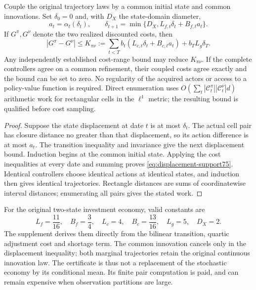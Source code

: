 \begin{theorem}\label{thm:displacement75}
Couple the original trajectory laws by a common initial state and common innovations. Set $\delta_0=0$ and, with $D_X$ the state-domain diameter,
\[
 a_t=\alpha_t(\delta_t),\qquad
 \delta_{t+1}=\min\{D_X,L_{f,t}\delta_t+B_{f,t}a_t\}.
\]
If $G^\pi,G^\nu$ denote the two realized discounted costs, then
\begin{equation}\label{eq:displacement-support75}
 |G^\pi-G^\nu|\le K_{\pi\nu}:=
 \sum_{t<T}b_t(L_{c,t}\delta_t+B_{c,t}a_t)+b_TL_g\delta_T.
\end{equation}
Any independently established cost-range bound may reduce $K_{\pi\nu}$. If the complete controllers agree on a common refinement, their coupled costs agree exactly and the bound can be set to zero. No regularity of the acquired actors or access to a policy-value function is required. Direct enumeration uses $O(\sum_t|\mathcal C_t^\pi||\mathcal C_t^\nu|d)$ arithmetic work for rectangular cells in the $\ell^1$ metric; the resulting bound is qualified before cost sampling.
\end{theorem}

\begin{proof}
Suppose the state displacement at date $t$ is at most $\delta_t$. The actual cell pair has closure distance no greater than that displacement, so its action difference is at most $a_t$. The transition inequality and invariance give the next displacement bound. Induction begins at the common initial state. Applying the cost inequalities at every date and summing proves \eqref{eq:displacement-support75}. Identical controllers choose identical actions at identical states, and induction then gives identical trajectories. Rectangle distances are sums of coordinatewise interval distances; enumerating all pairs gives the stated work.
\end{proof}

For the original two-state investment economy, valid constants are
\[
 L_f=\frac{11}{16},\quad B_f=\frac34,\quad
 L_c=4,\quad B_c=\frac{13}{16},\quad L_g=5,\quad D_X=2.
\]
The supplement derives them directly from the bilinear transition, quartic adjustment cost and shortage term. The common innovation cancels only in the displacement inequality; both marginal trajectories retain the original continuous innovation law. The certificate is thus not a replacement of the stochastic economy by its conditional mean. Its finite pair computation is paid, and can remain expensive when observation partitions are large.

